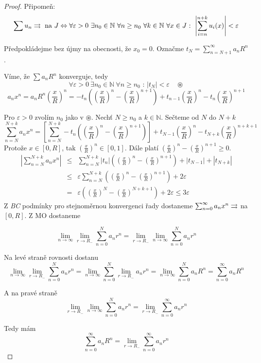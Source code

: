 \begin{proof}
Připomeň: 
$$\sum u_n \rightrightarrows \textrm{ na } J \Leftrightarrow \forall \varepsilon > 0 \ \exists n_0 \in \mathbb{N} \ \forall n \geq n_0 \ \forall k \in \mathbb{N} \ \forall x \in J \textrm{ : } \left| \sum_{i=n}^{n+k} u_i(x) \right| < \varepsilon$$

Předpokládejme bez újmy na obecnosti, že $x_0 = 0$. Označme $t_N = \sum_{n=N+1}^{\infty} a_n R^n$. 

Víme, že $\sum a_n R^n$ konverguje, tedy
$$\forall \varepsilon>0 \ \exists n_0 \in \mathbb{N} \ \forall n \geq n_0 \textrm{ : } |t_N| < \varepsilon \quad \circledast$$
$$a_n x^n = a_n R^n \left( \frac{x}{R} \right)^n = - t_n \left( \left( \frac{x}{R} \right)^n - \left( \frac{x}{R} \right)^{n+1} \right) + t_{n-1} \left( \frac{x}{R} \right)^n - t_n \left( \frac{x}{R} \right)^{n+1}$$

Pro $\varepsilon > 0$ zvolím $n_0$ jako v $\circledast$. Nechť $N \geq n_0$ a $k \in \mathbb{N}$. Sečteme od $N$ do $N+k$
$$\sum_{n=N}^{N+k} a_n x^n = \left[ \sum_{n=N}^{N+k} -t_n \left( \left( \frac{x}{R} \right)^n - \left( \frac{x}{R} \right)^{n+1} \right) \right] + t_{N-1} \left( \frac{x}{R} \right)^n - t_{N+k} \left( \frac{x}{R} \right)^{n+k+1}$$
Protože $x \in [0, R]$, tak $\left( \frac{x}{R} \right)^n \in [0,1]$. Dále platí $\left( \frac{x}{R} \right)^{n} - \left( \frac{x}{R} \right)^{n+1} \geq 0$.
\begin{eqnarray*}
\left|\sum_{n=N}^{N+k} a_n x^n \right| & \leq & \sum_{n=N}^{N+k} |t_n| \left( \left( \frac{x}{R} \right)^{n} - \left( \frac{x}{R} \right)^{n+1} \right) + |t_{N-1}| + |t_{N+k}| \\
& \leq & \varepsilon \sum_{n=N}^{N+k} \left( \left( \frac{x}{R} \right)^{n} - \left( \frac{x}{R} \right)^{n+1} \right) + 2 \varepsilon \\
& = & \varepsilon \left( \left( \frac{x}{R} \right)^{N} - \left( \frac{x}{R} \right)^{N+k+1} \right) + 2 \varepsilon \leq 3 \varepsilon
\end{eqnarray*}
Z \emph{BC} podmínky pro stejnoměrnou konvergenci řady dostaneme $\sum_{n=0}^{\infty} a_n x^n \rightrightarrows$ na $[0, R]$. Z MO dostaneme

$$\lim_{n \rightarrow \infty} \lim_{r \rightarrow R_-} \sum_{n=0}^{N} a_n r^n = \lim_{r \rightarrow R_-} \lim_{n \rightarrow \infty} \sum_{n=0}^{N} a_n r^n$$

Na levé straně rovnosti dostanu
$$\lim_{n \rightarrow \infty} \lim_{r \rightarrow R_-} \sum_{n=0}^{N} a_n r^n = \lim_{n \rightarrow \infty} \sum_{n=0}^{N} \lim_{r \rightarrow R_-} a_n r^n = \lim_{n \rightarrow \infty} \sum_{n=0}^{N} a_n R^n = \sum_{n=0}^\infty a_n R^n$$

A na pravé straně
$$\lim_{r \rightarrow R_-} \lim_{n \rightarrow \infty} \sum_{n=0}^{N} a_n r^n = \lim_{r \rightarrow R_-} \sum_{n=0}^\infty a_n r^n$$

Tedy mám
$$\sum_{n=0}^\infty a_n R^n = \lim_{r \rightarrow R_-} \sum_{n=0}^\infty a_n r^n$$
\end{proof}


